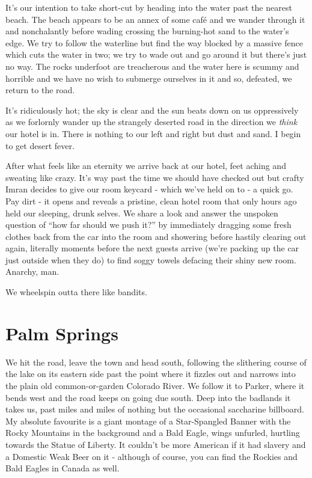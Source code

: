 \documentclass[a5paper,titlepage,11pt,draft]{book}
\begin{document}
It's our intention to take short-cut by heading into the water past the nearest beach.  The beach appears to be an annex of some caf\'{e} and we wander through it and nonchalantly before wading crossing the burning-hot sand to the water's edge.  We try to follow the waterline but find the way blocked by a massive fence which cuts the water in two; we try to wade out and go around it but there's just no way.  The rocks underfoot are treacherous and the water here is scummy and horrible and we have no wish to submerge ourselves in it and so, defeated, we return to the road.

It's ridiculously hot; the sky is clear and the sun beats down on us oppressively as we forlornly wander up the strangely deserted road in the direction we \emph{think} our hotel is in.  There is nothing to our left and right but dust and sand.  I begin to get desert fever.

After what feels like an eternity we arrive back at our hotel, feet aching and sweating like crazy.  It's way past the time we should have checked out but crafty Imran decides to give our room keycard - which we've held on to - a quick go.  Pay dirt - it opens and reveals a pristine, clean hotel room that only hours ago held our sleeping, drunk selves.  We share a look and answer the unspoken question of ``how far should we push it?'' by immediately dragging some fresh clothes back from the car into the room and showering before hastily clearing out again, literally moments before the next guests arrive (we're packing up the car just outside when they do) to find soggy towels defacing their shiny new room.  Anarchy, man.

We wheelspin outta there like bandits.

\section*{Palm Springs}
We hit the road, leave the town and head south, following the slithering course of the lake on its eastern side past the point where it fizzles out and narrows into the plain old common-or-garden Colorado River.  We follow it to Parker, where it bends west and the road keeps on going due south.  Deep into the badlands it takes us, past miles and miles of nothing but the occasional saccharine billboard.  My absolute favourite is a giant montage of a Star-Spangled Banner with the Rocky Mountains in the background and a Bald Eagle, wings unfurled, hurtling towards the Statue of Liberty.  It couldn't be more American if it had slavery and a Domestic Weak Beer on it - although of course, you can find the Rockies and Bald Eagles in Canada as well.
\end{document}
